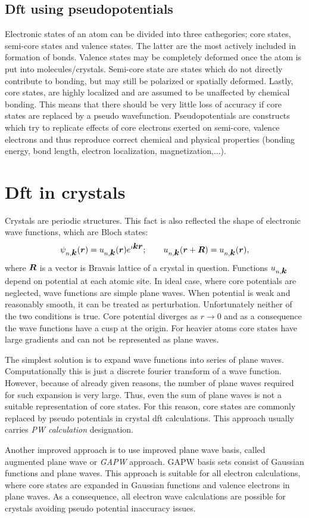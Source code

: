 \documentclass[openany, longbibliography,slovene,a4paper,12pt]{article}
\def\vec#1{\mbox{\boldmath$#1$}}
\begin{document}
\subsection{Dft using pseudopotentials}
Electronic states of an atom can be divided into three cathegories; core states,
semi-core states and valence states. The latter are the most actively included
in formation of bonds. Valence states may be completely deformed once the atom
is put into molecules/crystals. Semi-core state are states which do not
directly contribute to bonding, but may still be polarized or spatially
deformed. Lastly, core states, are highly localized and are assumed to be
unaffected by chemical bonding. This means that there should be very little loss
of accuracy if core states are replaced by a pseudo wavefunction.
Pseudopotentials are constructs which try to
replicate effects of core electrons exerted on semi-core, valence electrons and
thus reproduce correct chemical and physical properties (bonding energy, bond
length, electron localization, magnetization,...).


\section{Dft in crystals}
Crystals are periodic structures. This fact is also reflected the shape of
electronic  wave functions, which are Bloch states:
\begin{equation}
  \psi_{n, \vec k}(\vec r) = u_{n, \vec k}(\vec r)e^{i\vec k \vec r};\quad \textrm\quad u_{n,\vec k}(\vec r + \vec R) =  u_{n,\vec k}(\vec r),
\end{equation}
where $\vec R$ is a vector is Bravais lattice of a crystal in question.
Functions $u_{n,\vec k}$ depend on potential at each atomic site.
In ideal case, where core potentials are neglected,
wave functions are simple plane waves. When potential is weak and
reasonably smooth, it can be treated as perturbation. Unfortunately neither of
the two conditions is true. Core potential diverges as $r \rightarrow 0$
and as a consequence the wave functions have a cusp at the origin. For heavier
atoms core states have large gradients and can not be represented as plane waves.

The simplest solution is to expand wave functions into series of plane waves.
Computationally this is just a discrete fourier transform of a wave function.
However, because of already given reasons, the number of plane waves required
for such expansion is very large. Thus, even the sum of plane waves is not a
suitable representation of core states. For this reason, core states are
commonly replaced by pseudo potentials in crystal dft calculations. This
approach usually carries \emph{PW calculation} designation. 

Another improved approach is to use improved plane wave basis, called augmented
plane wave or \emph{GAPW} approach. GAPW basis sets consist of Gaussian
functions and plane waves. This approach is suitable for all electron
calculations, where core states are expanded in Gaussian functions and valence
electrons in plane waves. As a consequence, all electron wave calculations are
possible for crystals avoiding pseudo potential inaccuracy issues.
\end{document}
